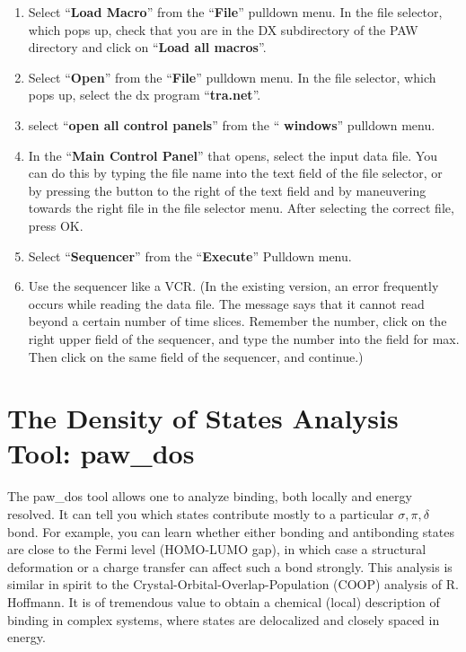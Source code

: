 \documentclass[final,12pt,makeidx,DIV=calc]{article}
\begin{document}
{{{{{{\bigskip{}\bigskip

\begin{enumerate}
\item Select ``{\bf Load Macro}'' from the ``{\bf File}'' pulldown
  menu. In the file selector, which pops up, check that you are in
  the DX subdirectory of the PAW directory and click on ``{\bf Load
    all macros}''.
\item Select ``{\bf Open}'' from the ``{\bf File}'' pulldown menu. In the file
  selector, which pops up, select the dx program ``{\bf tra.net}''.
\item select ``{\bf open all control panels}'' from the ``{\bf
    windows}'' pulldown menu.
\item In the ``{\bf Main Control Panel}'' that opens, select the input
  data file. You can do this by typing the file name into the text
  field of the file selector, or by pressing the button to the right of
  the text field and by maneuvering towards the right file in the
  file selector menu. After selecting the correct file, press OK.
\item Select ``{\bf Sequencer}'' from the ``{\bf Execute}'' Pulldown menu.
\item Use the sequencer like a VCR. (In the existing version, an error
  frequently occurs while reading the data file. The message says that it
  cannot read beyond a certain number of time slices. Remember the
  number, click on the right upper field of the sequencer, and type the
  number into the field for max. Then click on the same field of the
  sequencer, and continue.)
\end{enumerate}

\newpage
\section{The Density of States Analysis Tool: paw\_dos}
The paw\_dos tool allows one to analyze binding, both locally and energy
resolved. It can tell you which states contribute mostly to a
particular $\sigma, \pi, \delta$ bond. For example, you can learn whether
either bonding and antibonding states are close to the Fermi level
(HOMO-LUMO gap), in which case a structural deformation or a charge
transfer can affect such a bond strongly. This analysis is similar in
spirit to the Crystal-Orbital-Overlap-Population (COOP) analysis of R.
Hoffmann. It is of tremendous value to obtain a chemical (local)
description of binding in complex systems, where states are
delocalized and closely spaced in energy.

}}}}}}
\end{document}
